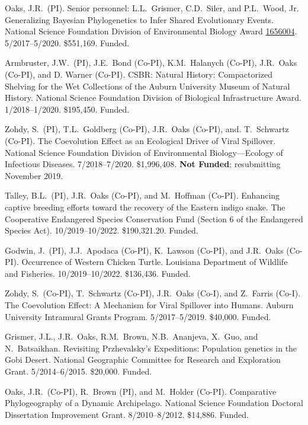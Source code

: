 \myHangIndent
Oaks, J.R.\ (PI).
Senior personnel: L.L.\ Grismer, C.D.\ Siler, and P.L.\ Wood, Jr.
Generalizing Bayesian Phylogenetics to Infer Shared Evolutionary Events.
National Science Foundation Division of Environmental Biology Award
\href{https://www.nsf.gov/awardsearch/showAward?AWD_ID=1656004&HistoricalAwards=false}{1656004}.
5/2017--5/2020.
\$551,169.
Funded.

\myHangIndent
Armbruster, J.W.\ (PI),
J.E.\ Bond (Co-PI),
K.M.\ Halanych (Co-PI),
J.R.\ Oaks (Co-PI),
and
D. Warner (Co-PI).
CSBR: Natural History: Compactorized Shelving for the Wet Collections of the
Auburn University Museum of Natural History.
National Science Foundation Division of Biological Infrastructure Award.
1/2018--1/2020.
\$195,450.
Funded.

\myHangIndent
Zohdy, S.\ (PI),
T.L.\ Goldberg (Co-PI),
J.R.\ Oaks (Co-PI), and.
T.\ Schwartz (Co-PI).
The Coevolution Effect as an Ecological Driver of Viral Spillover.
National Science Foundation Division of Environmental Biology---Ecology of Infectious Diseases.
7/2018--7/2020.
\$1,996,408.
\textbf{Not Funded}; resubmitting November 2019.

\myHangIndent
Talley, B.L.\ (PI),
J.R.\ Oaks (Co-PI),
and
M.\ Hoffman (Co-PI).
Enhancing captive breeding efforts toward the recovery of the Eastern indigo snake.
The Cooperative Endangered Species Conservation Fund (Section 6 of the
Endangered Species Act).
10/2019--10/2022.
\$190,321.20.
Funded.

\myHangIndent
Godwin, J.\ (PI),
J.J.\ Apodaca (Co-PI),
K.\ Lawson (Co-PI),
and
J.R.\ Oaks (Co-PI).
Occurrence of Western Chicken Turtle.
Louisiana Department of Wildlife and Fisheries.
10/2019--10/2022.
\$136,436.
Funded.

\myHangIndent
Zohdy, S.\ (Co-PI), T.\ Schwartz (Co-PI), J.R.\ Oaks (Co-I), and Z.\ Farris (Co-I).
The Coevolution Effect: A Mechanism for Viral Spillover into Humans.
Auburn University Intramural Grants Program.
5/2017--5/2019.
\$40,000.
Funded.

\myHangIndent
Grismer, J.L., J.R.\ Oaks, R.M.\ Brown, N.B.\ Ananjeva, X.\ Guo, and N.\
Batsaikhan.
Revisiting Przhevalsky's Expeditions: Population genetics in the Gobi Desert.
National Geographic Committee for Research and Exploration Grant.
5/2014--6/2015.
\$20,000.
Funded.

\myHangIndent
Oaks, J.R.\ (Co-PI), R.\ Brown (PI), and M.\ Holder (Co-PI).
Comparative Phylogeography of a Dynamic Archipelago.
National Science Foundation Doctoral Dissertation Improvement Grant.
8/2010--8/2012.
\$14,886.
Funded.

